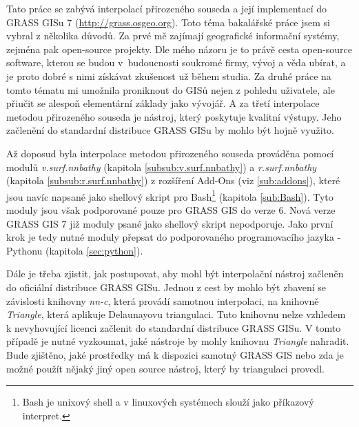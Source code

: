 \documentclass[12pt,a4paper]{article}
\begin{document}
\bigskip

Tato práce se zabývá interpolací přirozeného souseda a její
implementací do GRASS GISu 7 (\url{http://grass.osgeo.org}).
Toto téma bakalářské práce jsem si vybral z několika důvodů. Za prvé
mě zajímají geografické informační systémy, zejména pak open-source
projekty. Dle mého názoru je to právě cesta open-source software,
kterou se budou v~budoucnosti soukromé firmy, vývoj a věda ubírat, a
je proto dobré s nimi získávat zkušenost už během studia. Za druhé
práce na tomto tématu mi umožnila proniknout do GISů nejen z pohledu
uživatele, ale přiučit se alespoň elementární základy jako vývojář. A
za třetí interpolace metodou přirozeného souseda je nástroj, který
poskytuje kvalitní výstupy. Jeho začlenění do standardní distribuce
GRASS GISu by mohlo být hojně využito.

Až doposud byla interpolace metodou přirozeného souseda prováděna
pomocí modulů \emph{v.surf.nnbathy} (kapitola \ref{subsub:v.surf.nnbathy}) a \emph{r.surf.nnbathy} (kapitola \ref{subsub:r.surf.nnbathy}) z
rozšíření Add-Ons (viz \ref{sub:addons}), které jsou navíc napsané jako shellový skript pro Bash\footnote{Bash je unixový shell a v linuxových systémech slouží jako příkazový interpret.} (kapitola \ref{sub:Bash}). Tyto moduly jsou
však podporované pouze pro GRASS GIS do verze 6. Nová verze GRASS GIS
7 již moduly psané jako shellový skript nepodporuje. Jako první krok je tedy
nutné moduly přepsat do podporovaného programovacího jazyka - Pythonu (kapitola \ref{sec:python}).

\newpage

Dále je třeba zjistit, jak postupovat, aby mohl být interpolační
nástroj začleněn do oficiální distribuce GRASS GISu. Jednou z cest by
mohlo být zbavení se závislosti knihovny \emph{nn-c}, která provádí
samotnou interpolaci, na knihovně \emph{Triangle}, která aplikuje
Delaunayovu triangulaci. Tuto knihovnu nelze vzhledem k nevyhovující
licenci začlenit do standardní distribuce GRASS GISu. V tomto případě
je nutné vyzkoumat, jaké nástroje by mohly knihovnu \emph{Triangle}
nahradit. Bude zjištěno, jaké prostředky má k dispozici samotný GRASS
GIS nebo zda je možné použít nějaký jiný open source nástroj, který
by triangulaci provedl.
\end{document}
